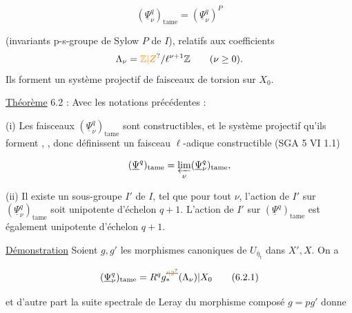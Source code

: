 \[
\boxed{(\underline{\Psi}_\nu^q)_{\mathrm{tame}}=(\underline{\Psi}_\nu^q)^P}
\tag*{6.1.1}
\]

(invariants   p-s-groupe de Sylow $P$ de $I$),  relatifs aux coefficients
\[
\Lambda_\nu=\unsure{\mathbb{Z}|Z}/\ell^{\nu+1}\mathbb{Z}\qquad(\nu\geq0).
\]
 Ils forment un système projectif de faisceaux de torsion sur $X_0$.

\uline{Théorème} 6.2 : Avec les notations précédentes :

(i) Les faisceaux $(\underline{\Psi}_\nu^q)_{\mathrm{tame}}$ sont constructibles, et  le système projectif qu'ils forment  , , donc définissent un faisceau $\ell$-adique constructible (SGA 5 VI 1.1)

\[
(\underline{\Psi}^q)_{\mathrm{tame}}=\varprojlim_\nu(\underline{\Psi}_\nu^q)_{\mathrm{tame}},
\]


(ii) Il existe un sous-groupe  $I'$ de $I$,  tel que pour tout $\nu$, l'action de $I'$ sur $(\underline{\Psi}_\nu^q)_{\mathrm{tame}}$ soit unipotente d'échelon  $q+1$.  L'action de $I'$ sur $(\underline{\Psi}^q)_{\mathrm{tame}}$ est également unipotente d'échelon  $q+1$.

\uline{Démonstration} Soient $g,g'$ les morphismes canoniques de $U_{\overline\eta_t}$ dans $X',X$. On a


\[
(\underline{\Psi}_\nu^q)_{\mathrm{tame}}=R^q g_*^{\deleted{\unsure{\prime|2}}}(\Lambda_\nu)|X_0
\tag*{(6.2.1)}
\]

et  d'autre part la suite spectrale de Leray du morphisme composé $g=pg'$ donne

